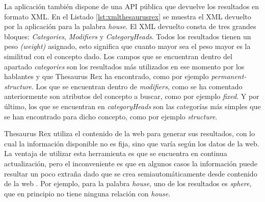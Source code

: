 La aplicación también dispone de una API pública que devuelve los resultados en formato XML.
En el Listado \ref{lst:xmlthesaurusrex} se muestra el XML devuelto por la aplicación para la palabra \textit{house}. El XML devuelto consta de tres grandes bloques: \textit{Categories}, \textit{Modifiers} y \textit{CategoryHeads}. Todos los resultados tienen un peso \textit{(weight)} asignado, esto significa que cuanto mayor sea el peso mayor es la similitud con el concepto dado. 
Los campos que se encuentran dentro del apartado \textit{categories} son los resultados más utilizados en ese momento por los hablantes y que Thesaurus Rex ha encontrado, como por ejemplo \textit{permanent-structure}. Los que se encuentran dentro de  \textit{modifiers}, como se ha comentado anteriormente son atributos del concepto a buscar, como por ejemplo \textit{fixed}. Y por último, los que se encuentran en \textit{categoryHeads} son las categorías más simples que se han encontrado para dicho concepto, como por ejemplo \textit{structure}.

Thesaurus Rex utiliza el contenido de la web para generar sus resultados, con lo cual la información disponible no es fija, sino que varía según los datos de la web.
La ventaja de utilizar esta herramienta es que se encuentra en continua actualización, pero el inconveniente es que en algunos casos la información puede resultar un poco extraña dado que se crea semiautomáticamente desde contenido de la web \citep{VealeT2013}. Por ejemplo, para la palabra \textit{house}, uno de los resultados es \textit{sphere}, que en principio no tiene ninguna relación con \textit{house}.

